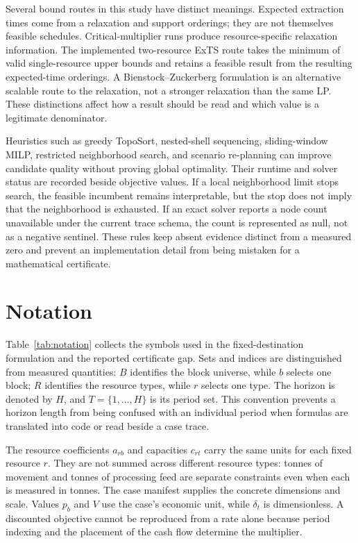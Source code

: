 Several bound routes in this study have distinct meanings. Expected extraction times come from a relaxation and support orderings; they are not themselves feasible schedules. Critical-multiplier runs produce resource-specific relaxation information. The implemented two-resource ExTS route takes the minimum of valid single-resource upper bounds and retains a feasible result from the resulting expected-time orderings. A Bienstock--Zuckerberg formulation is an alternative scalable route to the relaxation, not a stronger relaxation than the same LP. These distinctions affect how a result should be read and which value is a legitimate denominator.

Heuristics such as greedy TopoSort, nested-shell sequencing, sliding-window MILP, restricted neighborhood search, and scenario re-planning can improve candidate quality without proving global optimality. Their runtime and solver status are recorded beside objective values. If a local neighborhood limit stops search, the feasible incumbent remains interpretable, but the stop does not imply that the neighborhood is exhausted. If an exact solver reports a node count unavailable under the current trace schema, the count is represented as null, not as a negative sentinel. These rules keep absent evidence distinct from a measured zero and prevent an implementation detail from being mistaken for a mathematical certificate.

\section{Notation}
\label{sec:notation}
Table~\ref{tab:notation} collects the symbols used in the fixed-destination formulation and the reported certificate gap. Sets and indices are distinguished from measured quantities: $B$ identifies the block universe, while $b$ selects one block; $R$ identifies the resource types, while $r$ selects one type. The horizon is denoted by $H$, and $T=\{1,\ldots,H\}$ is its period set. This convention prevents a horizon length from being confused with an individual period when formulas are translated into code or read beside a case trace.

The resource coefficients $a_{rb}$ and capacities $c_{rt}$ carry the same units for each fixed resource $r$. They are not summed across different resource types: tonnes of movement and tonnes of processing feed are separate constraints even when each is measured in tonnes. The case manifest supplies the concrete dimensions and scale. Values $p_b$ and $V$ use the case's economic unit, while $\delta_t$ is dimensionless. A discounted objective cannot be reproduced from a rate alone because period indexing and the placement of the cash flow determine the multiplier.

